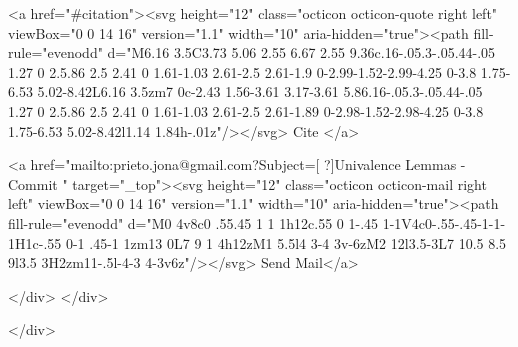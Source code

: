       <a  href="#citation"><svg height="12" class="octicon octicon-quote right left" viewBox="0 0 14 16" version="1.1" width="10" aria-hidden="true"><path fill-rule="evenodd" d="M6.16 3.5C3.73 5.06 2.55 6.67 2.55 9.36c.16-.05.3-.05.44-.05 1.27 0 2.5.86 2.5 2.41 0 1.61-1.03 2.61-2.5 2.61-1.9 0-2.99-1.52-2.99-4.25 0-3.8 1.75-6.53 5.02-8.42L6.16 3.5zm7 0c-2.43 1.56-3.61 3.17-3.61 5.86.16-.05.3-.05.44-.05 1.27 0 2.5.86 2.5 2.41 0 1.61-1.03 2.61-2.5 2.61-1.89 0-2.98-1.52-2.98-4.25 0-3.8 1.75-6.53 5.02-8.42l1.14 1.84h-.01z"/></svg> Cite
      </a>

      <a href="mailto:prieto.jona@gmail.com?Subject=[ ?]Univalence Lemmas - Commit " target="_top"><svg height="12" class="octicon octicon-mail right left" viewBox="0 0 14 16" version="1.1" width="10" aria-hidden="true"><path fill-rule="evenodd" d="M0 4v8c0 .55.45 1 1 1h12c.55 0 1-.45 1-1V4c0-.55-.45-1-1-1H1c-.55 0-1 .45-1 1zm13 0L7 9 1 4h12zM1 5.5l4 3-4 3v-6zM2 12l3.5-3L7 10.5 8.5 9l3.5 3H2zm11-.5l-4-3 4-3v6z"/></svg> Send Mail</a>

    </div>
  </div>

</div>




